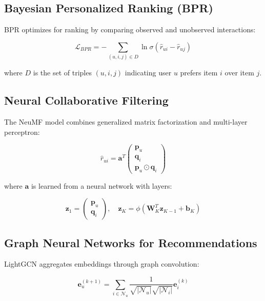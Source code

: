 \subsection{Bayesian Personalized Ranking (BPR)}

BPR optimizes for ranking by comparing observed and unobserved interactions:

\begin{equation}
\mathcal{L}_{BPR} = -\sum_{(u,i,j) \in D} \ln \sigma(\hat{r}_{ui} - \hat{r}_{uj})
\end{equation}

where $D$ is the set of triples $(u,i,j)$ indicating user $u$ prefers item $i$ over item $j$.

\subsection{Neural Collaborative Filtering}

The NeuMF model combines generalized matrix factorization and multi-layer perceptron:

\begin{equation}
\hat{r}_{ui} = \mathbf{a}^T \begin{pmatrix} \mathbf{p}_u \\ \mathbf{q}_i \\ \mathbf{p}_u \odot \mathbf{q}_i \end{pmatrix}
\end{equation}

where $\mathbf{a}$ is learned from a neural network with layers:

\begin{equation}
\mathbf{z}_1 = \begin{pmatrix} \mathbf{p}_u \\ \mathbf{q}_i \end{pmatrix}, \quad \mathbf{z}_K = \phi(\mathbf{W}_K^T \mathbf{z}_{K-1} + \mathbf{b}_K)
\end{equation}

\subsection{Graph Neural Networks for Recommendations}

LightGCN aggregates embeddings through graph convolution:

\begin{equation}
\mathbf{e}_u^{(k+1)} = \sum_{i \in \mathcal{N}_u} \frac{1}{\sqrt{|\mathcal{N}_u|} \sqrt{|\mathcal{N}_i|}} \mathbf{e}_i^{(k)}
\end{equation}

